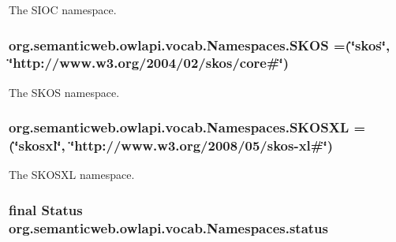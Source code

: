 The S\-I\-O\-C namespace. \hypertarget{enumorg_1_1semanticweb_1_1owlapi_1_1vocab_1_1_namespaces_ad1bd8118e45698d106a4bccb2d27b98b}{
\subsubsection[{S\-K\-O\-S}]{\setlength{\rightskip}{0pt plus 5cm}org.\-semanticweb.\-owlapi.\-vocab.\-Namespaces.\-S\-K\-O\-S =(\char`\"{}skos\char`\"{}, \char`\"{}http\-://www.\-w3.\-org/2004/02/skos/core\#\char`\"{})}}\label{enumorg_1_1semanticweb_1_1owlapi_1_1vocab_1_1_namespaces_ad1bd8118e45698d106a4bccb2d27b98b}
The S\-K\-O\-S namespace. \hypertarget{enumorg_1_1semanticweb_1_1owlapi_1_1vocab_1_1_namespaces_a764cd936be8044d883a5c99766eefea6}{
\subsubsection[{S\-K\-O\-S\-X\-L}]{\setlength{\rightskip}{0pt plus 5cm}org.\-semanticweb.\-owlapi.\-vocab.\-Namespaces.\-S\-K\-O\-S\-X\-L =(\char`\"{}skosxl\char`\"{}, \char`\"{}http\-://www.\-w3.\-org/2008/05/skos-\/xl\#\char`\"{})}}\label{enumorg_1_1semanticweb_1_1owlapi_1_1vocab_1_1_namespaces_a764cd936be8044d883a5c99766eefea6}
The S\-K\-O\-S\-X\-L namespace. \hypertarget{enumorg_1_1semanticweb_1_1owlapi_1_1vocab_1_1_namespaces_ae28791da010806ce31d87f0a53ba6bb7}{
\subsubsection[{status}]{\setlength{\rightskip}{0pt plus 5cm}final Status org.\-semanticweb.\-owlapi.\-vocab.\-Namespaces.\-status}}\label{enumorg_1_1semanticweb_1_1owlapi_1_1vocab_1_1_namespaces_ae28791da010806ce31d87f0a53ba6bb7}

